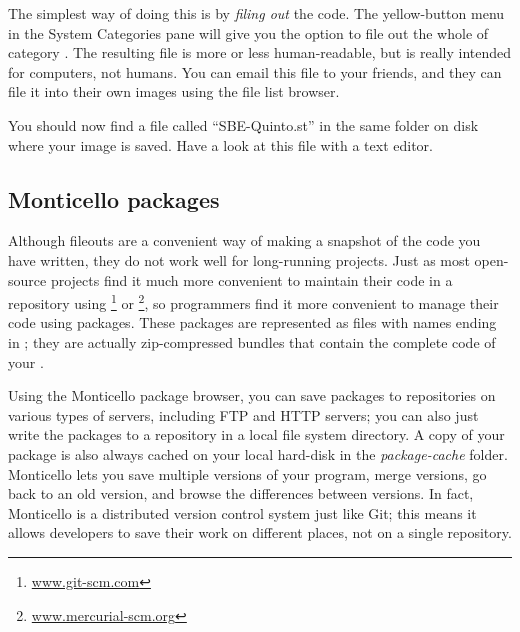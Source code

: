 \documentclass[a4paper,10pt,twoside]{book}
\begin{document}
The simplest way of doing this is by \emph{filing out} the code.
The yellow-button menu in the System Categories pane will give you the option to file out the whole of category .
The resulting file is more or less human-readable, but is really intended for computers, not humans.
You can email this file to your friends, and they can file it into their own \squeak images using the file list browser.

You should now find a file called ``SBE-Quinto.st'' in the same folder on disk where your image is saved.
Have a look at this file with a text editor.


\subsection{Monticello packages}
Although fileouts are a convenient way of making a snapshot of the code you have written, they do not work well for long-running projects.
Just as most open-source projects find it much more convenient to maintain their code in a repository using \footnote{\url{www.git-scm.com}} or \footnote{\url{www.mercurial-scm.org}}, so \squeak programmers find it more convenient to manage their code using  packages.
These packages are represented as files with names ending in ; they are actually zip-compressed bundles that contain the complete code of your .

Using the Monticello package browser, you can save packages to repositories on various types of servers, including FTP and HTTP servers; you can also just write the packages to a repository in a local file system directory.
A copy of your package is also always cached on your local hard-disk in the \emph{package-cache} folder.
Monticello lets you save multiple versions of your program, merge versions, go back to an old version, and browse the differences between versions.
In fact, Monticello is a distributed version control system just like Git; this means it allows developers to save their work on different places, not on a single repository.
\end{document}
